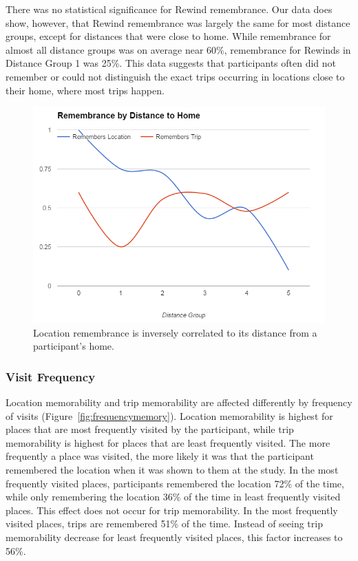 \documentclass{sigchi}
\begin{document}
There was no statistical significance for Rewind remembrance. Our data does show, however, that Rewind remembrance was largely the same for most distance groups, except for distances that were close to home. While remembrance for almost all distance groups was on average near 60\%, remembrance for Rewinds in Distance Group 1 was 25\%. This data suggests that participants often did not remember or could not distinguish the exact trips occurring in locations close to their home, where most trips happen.  

\begin{figure}
	\centering
	\includegraphics[width=1\linewidth]{distance}
	\caption{Location remembrance is inversely correlated to its distance from a participant's home.}
	\label{fig:distancememory}
\end{figure}

\subsubsection{Visit Frequency}
Location memorability and trip memorability are affected differently by frequency of visits (Figure~\ref{fig:frequencymemory}). Location memorability is highest for places that are most frequently visited by the participant, while trip memorability is highest for places that are least frequently visited. The more frequently a place was visited, the more likely it was that the participant remembered the location when it was shown to them at the study. In the most frequently visited places, participants remembered the location 72\% of the time, while only remembering the location 36\% of the time in least frequently visited places. This effect does not occur for trip memorability. In the most frequently visited places, trips are remembered 51\% of the time. Instead of seeing trip memorability decrease for least frequently visited places, this factor increases to 56\%.
\end{document}
